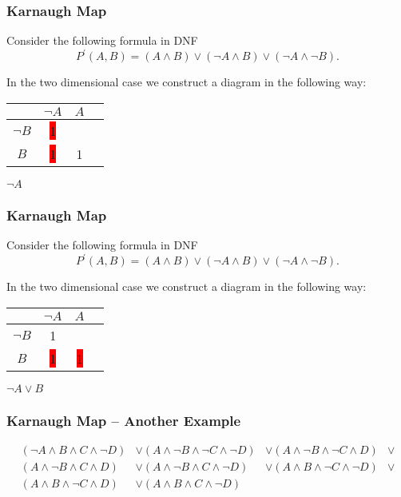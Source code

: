\documentclass{beamer}
\theoremstyle{remark}
\begin{document}
\begin{frame}
	\frametitle{Karnaugh Map}
	Consider the following formula in DNF
	\[ P^{\prime}(A, B) = (A \land B) \lor (\lnot A \land B) \lor (\lnot A \land \lnot B).\]
	
	In the two dimensional case we construct a diagram in the following way:
	
	\vspace{1.5em}
	
	\begin{center}
	\begin{tabular}{c|c|c|c}
		& $\lnot A$ & $A$ \\ \hline
		$\lnot B$ & \colorbox{red}{1} &  \\ \hline
		$B$ & \colorbox{red}{1} &  1\\ \hline
	\end{tabular}
	\end{center}
	
	$\lnot A$
\end{frame}

\begin{frame}
	\frametitle{Karnaugh Map}
	Consider the following formula in DNF
	\[ P^{\prime}(A, B) = (A \land B) \lor (\lnot A \land B) \lor (\lnot A \land \lnot B).\]
	
	In the two dimensional case we construct a diagram in the following way:
	
	\vspace{1.5em}
	
	\begin{center}
	\begin{tabular}{c|c|c|c}
		& $\lnot A$ & $A$ \\ \hline
		$\lnot B$ & 1 &  \\ \hline
		$B$ & \colorbox{red}{1} &  \colorbox{red}{1}\\ \hline
	\end{tabular}
	\end{center}
	
	$\lnot A \lor B$
\end{frame}

\begin{frame}
	\frametitle{Karnaugh Map -- Another Example}
	\begin{example}
		\begin{align*}
			(\lnot A \land B \land C \land \lnot D) & \lor (A \land \lnot B \land \lnot C \land \lnot D) & \lor (A \land \lnot B \land \lnot C \land D) & \lor \\
			(A \land \lnot B \land C \land D) & \lor (A \land \lnot B \land C \land \lnot D) & \lor (A \land B \land \lnot C \land \lnot D) & \lor \\
			(A \land B \land \lnot C \land D) & \lor (A \land B \land C \land \lnot D)
		\end{align*}
	\end{example}
\end{frame}
\end{document}

